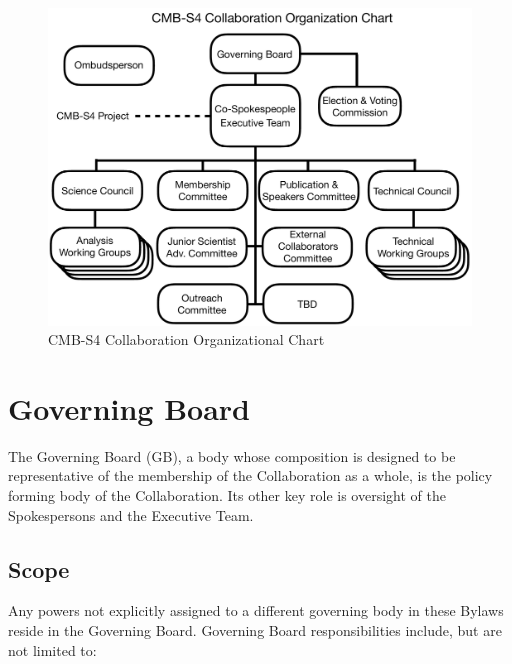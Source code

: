 \documentclass[12pt]{article}
\newcommand{\exec}{{Executive Team}}
\begin{document}
\begin{figure}[h!]
\begin{center}
\includegraphics[width=6.5in]{CMB-S4_Org_chart_+_details_v9.pdf}
\end{center}
\caption{CMB-S4 Collaboration Organizational Chart}
\label{fig:org_chart}
\end{figure}

\section{Governing Board}

The Governing Board (GB), a body whose composition is designed to be representative of the membership of the Collaboration as a whole, is the %
policy forming body of the Collaboration.  Its other key role is oversight of the Spokespersons and the \exec.

\subsection{Scope}
Any powers not explicitly assigned to a different governing body in these Bylaws reside in the Governing Board.
Governing Board responsibilities include, but are not limited to:  %
\end{document}
